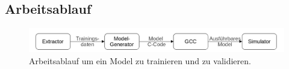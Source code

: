 \subsection{Arbeitsablauf}
\begin{figure}
    \centering
    \includegraphics[width=\linewidth]{images/model_workflow.jpg}
    \caption{Arbeitsablauf um ein Model zu trainieren und zu validieren.}
    \label{fig:model_workflow}
\end{figure}
